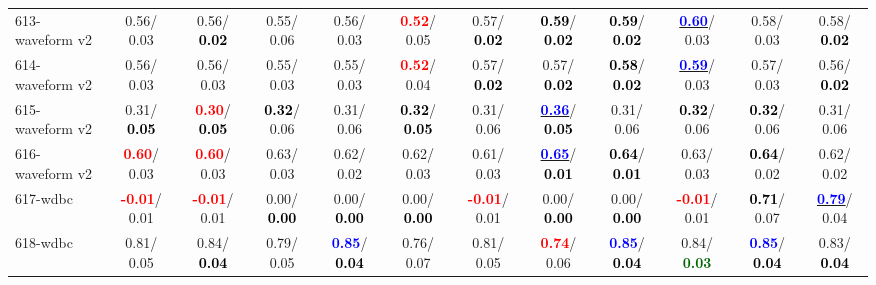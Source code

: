 \begin{table}[h]
\begin{center}
{\begin{tabular}{lc|c|c|c|c|c|c|c|c|c|c}
613-waveform v2 &   0.56/  0.03 &   0.56/\textcolor{black}{\textbf{  0.02}} &   0.55/  0.06 &   0.56/  0.03 & \textcolor{red}{\textbf{  0.52}}/  0.05 &   0.57/\textcolor{black}{\textbf{  0.02}} & \textcolor{black}{\textbf{  0.59}}/\textcolor{black}{\textbf{  0.02}} & \textcolor{black}{\textbf{  0.59}}/\textcolor{black}{\textbf{  0.02}} & \underline{\textcolor{blue}{\textbf{  0.60}}}/  0.03 &   0.58/  0.03 &   0.58/\textcolor{black}{\textbf{  0.02}} \\
614-waveform v2 &   0.56/  0.03 &   0.56/  0.03 &   0.55/  0.03 &   0.55/  0.03 & \textcolor{red}{\textbf{  0.52}}/  0.04 &   0.57/\textcolor{black}{\textbf{  0.02}} &   0.57/\textcolor{black}{\textbf{  0.02}} & \textcolor{black}{\textbf{  0.58}}/\textcolor{black}{\textbf{  0.02}} & \underline{\textcolor{blue}{\textbf{  0.59}}}/  0.03 &   0.57/  0.03 &   0.56/\textcolor{black}{\textbf{  0.02}} \\
615-waveform v2 &   0.31/\textcolor{black}{\textbf{  0.05}} & \textcolor{red}{\textbf{  0.30}}/\textcolor{black}{\textbf{  0.05}} & \textcolor{black}{\textbf{  0.32}}/  0.06 &   0.31/  0.06 & \textcolor{black}{\textbf{  0.32}}/\textcolor{black}{\textbf{  0.05}} &   0.31/  0.06 & \underline{\textcolor{blue}{\textbf{  0.36}}}/\textcolor{black}{\textbf{  0.05}} &   0.31/  0.06 & \textcolor{black}{\textbf{  0.32}}/  0.06 & \textcolor{black}{\textbf{  0.32}}/  0.06 &   0.31/  0.06 \\ \hline
616-waveform v2 & \textcolor{red}{\textbf{  0.60}}/  0.03 & \textcolor{red}{\textbf{  0.60}}/  0.03 &   0.63/  0.03 &   0.62/  0.02 &   0.62/  0.03 &   0.61/  0.03 & \underline{\textcolor{blue}{\textbf{  0.65}}}/\textcolor{black}{\textbf{  0.01}} & \textcolor{black}{\textbf{  0.64}}/\textcolor{black}{\textbf{  0.01}} &   0.63/  0.03 & \textcolor{black}{\textbf{  0.64}}/  0.02 &   0.62/  0.02 \\
617-wdbc & \textcolor{red}{\textbf{ -0.01}}/  0.01 & \textcolor{red}{\textbf{ -0.01}}/  0.01 &   0.00/\textcolor{black}{\textbf{  0.00}} &   0.00/\textcolor{black}{\textbf{  0.00}} &   0.00/\textcolor{black}{\textbf{  0.00}} & \textcolor{red}{\textbf{ -0.01}}/  0.01 &   0.00/\textcolor{black}{\textbf{  0.00}} &   0.00/\textcolor{black}{\textbf{  0.00}} & \textcolor{red}{\textbf{ -0.01}}/  0.01 & \textcolor{black}{\textbf{  0.71}}/  0.07 & \underline{\textcolor{blue}{\textbf{  0.79}}}/  0.04 \\
618-wdbc &   0.81/  0.05 &   0.84/\textcolor{black}{\textbf{  0.04}} &   0.79/  0.05 & \textcolor{blue}{\textbf{  0.85}}/\textcolor{black}{\textbf{  0.04}} &   0.76/  0.07 &   0.81/  0.05 & \textcolor{red}{\textbf{  0.74}}/  0.06 & \textcolor{blue}{\textbf{  0.85}}/\textcolor{black}{\textbf{  0.04}} &   0.84/\textcolor{darkgreen}{\textbf{  0.03}} & \textcolor{blue}{\textbf{  0.85}}/\textcolor{black}{\textbf{  0.04}} &   0.83/\textcolor{black}{\textbf{  0.04}} \\

\end{tabular}}
\end{center}
\end{table}
